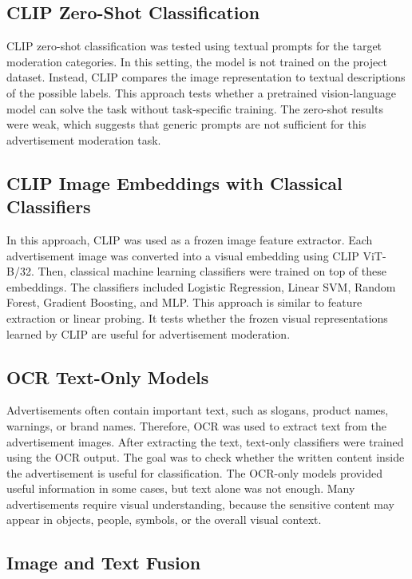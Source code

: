 \documentclass[12pt]{article}
\begin{document}
\subsection{CLIP Zero-Shot Classification}

CLIP zero-shot classification was tested using textual prompts for the target moderation categories. In this setting, the model is not trained on the project dataset. Instead, CLIP compares the image representation to textual descriptions of the possible labels. This approach tests whether a pretrained vision-language model can solve the task without task-specific training. The zero-shot results were weak, which suggests that generic prompts are not sufficient for this advertisement moderation task.

\subsection{CLIP Image Embeddings with Classical Classifiers}

In this approach, CLIP was used as a frozen image feature extractor. Each advertisement image was converted into a visual embedding using CLIP ViT-B/32. Then, classical machine learning classifiers were trained on top of these embeddings. The classifiers included Logistic Regression, Linear SVM, Random Forest, Gradient Boosting, and MLP. This approach is similar to feature extraction or linear probing. It tests whether the frozen visual representations learned by CLIP are useful for advertisement moderation.

\subsection{OCR Text-Only Models}

Advertisements often contain important text, such as slogans, product names, warnings, or brand names. Therefore, OCR was used to extract text from the advertisement images. After extracting the text, text-only classifiers were trained using the OCR output. The goal was to check whether the written content inside the advertisement is useful for classification. The OCR-only models provided useful information in some cases, but text alone was not enough. Many advertisements require visual understanding, because the sensitive content may appear in objects, people, symbols, or the overall visual context.

\subsection{Image and Text Fusion}
\end{document}
